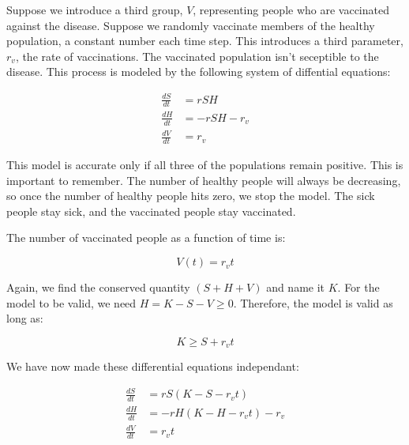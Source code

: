 \documentclass{article}
\begin{document}
Suppose we introduce a third group, $V$, representing people who are vaccinated	
	against the disease.
Suppose we randomly vaccinate members of the healthy population,
	a constant number each time step.
This introduces a third parameter, $r_v$, the rate of vaccinations.
The vaccinated population isn't seceptible to the disease.
This process is modeled by the following system of diffential equations:

\begin{align*}
\frac{dS}{dt} & = r S H \\
\frac{dH}{dt} & = - r S H - r_v \\
\frac{dV}{dt} & = r_v
\end{align*}

This model is accurate only if all three of the populations remain
	positive.
This is important to remember.
The number of healthy people will always be decreasing, so once
	the number of healthy people hits zero, we stop the model.
The sick people stay sick, and the vaccinated people stay vaccinated.

The number of vaccinated people as a function of time is:

\[ V(t) = r_v t \]

Again, we find the conserved quantity $\left( S + H + V \right)$ and
	name it $K$.
For the model to be valid, we need $H = K - S - V \geq 0$.
Therefore, the model is valid as long as:

\[ K \geq S + r_v t \]

We have now made these differential equations independant:

\begin{align*}
\frac{dS}{dt} & = r S \left( K - S - r_v t \right)\\
\frac{dH}{dt} & = - r H \left( K - H - r_v t \right) - r_v \\
\frac{dV}{dt} & = r_v t
\end{align*}
\end{document}
